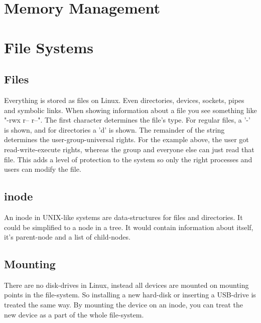 \documentclass[12pt]{article}
\begin{document}
\section{Memory Management} %


\section{File Systems} %
\subsection{Files}
Everything is stored as files on Linux. Even directories, devices, sockets, pipes and symbolic links.
When showing information about a file you see something like "-rwx r-- r--". 
The first character determines the file's type. For regular files, a '-' is shown, and for directories a 'd' is shown. 
The remainder of the string determines the user-group-universal rights. 
For the example above, the user got read-write-execute rights, whereas the group and everyone else can just read that file.
This adds a level of protection to the system so only the right processes and users can modify the file.

\subsection{inode}
An inode in UNIX-like systems are data-structures for files and directories. 
It could be simplified to a node in a tree. It would contain information about itself, it's parent-node and a list of child-nodes.

\subsection{Mounting}
There are no disk-drives in Linux, instead all devices are mounted on mounting points in the file-system. 
So installing a new hard-disk or inserting a USB-drive is treated the same way.
By mounting the device on an inode, you can treat the new device as a part of the whole file-system.
\end{document}
